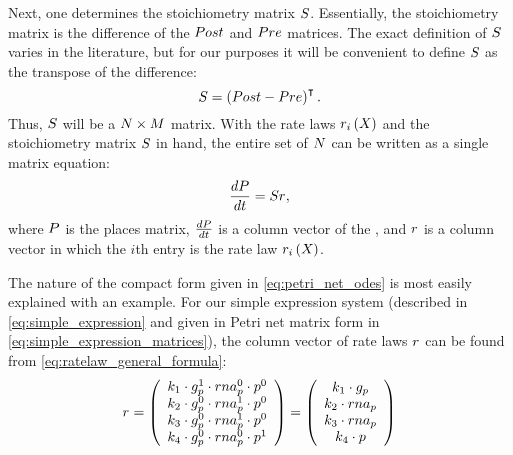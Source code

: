Next, one determines the stoichiometry matrix $S_{}$. Essentially, the stoichiometry matrix is the difference of the $Post$ and $Pre$ matrices. The exact definition of $S_{}$ varies in the literature, but for our purposes it will be convenient to define $S_{}$ as the transpose of the difference:
\begin{equation*}\label{eq:s_definition}
    S_{} = \left( Post - Pre \right)^{\intercal}.
\end{equation*}
Thus, $S_{}$ will be a $N \times M$ matrix. With the rate laws $r_{i} \left( X_{} \right)$ and the stoichiometry matrix $S_{}$ in hand, the entire set of $N$  can be written as a single matrix equation:
\begin{equation}\label{eq:petri_net_odes}
    \frac{dP}{dt} = S_{} r_{},
\end{equation}
where $P$ is the places matrix, $\frac{dP}{dt}$ is a column vector of the , and $r_{}$ is a column vector in which the $i$th entry is the rate law $r_{i} \left( X_{} \right)$. 

The nature of the compact form given in \eqref{eq:petri_net_odes} is most easily explained with an example. For our simple expression system (described in \eqref{eq:simple_expression} and given in Petri net matrix form in \eqref{eq:simple_expression_matrices}), the column vector of rate laws $r_{}$ can be found from \eqref{eq:ratelaw_general_formula}:
\begin{gather*}
    \rlawmat = 
%
    \left( \begin{array}{c}
        \condetx{1} \cdot \con{g_p}^{1} \cdot \con{rna_p}^{0} \cdot \con{p}^{0} \\
        \condetx{2} \cdot \con{g_p}^{0} \cdot \con{rna_p}^{1} \cdot \con{p}^{0} \\
        \condetx{3} \cdot \con{g_p}^{0} \cdot \con{rna_p}^{1} \cdot \con{p}^{0} \\
        \condetx{4} \cdot \con{g_p}^{0} \cdot \con{rna_p}^{0} \cdot \con{p}^{1}
    \end{array} \right) =
%
    \left( \begin{array}{c}
        \condetx{1} \cdot \con{g_p} \\
        \condetx{2} \cdot \con{rna_p} \\
        \condetx{3} \cdot \con{rna_p} \\
        \condetx{4} \cdot \con{p}
    \end{array} \right)
\end{gather*}

